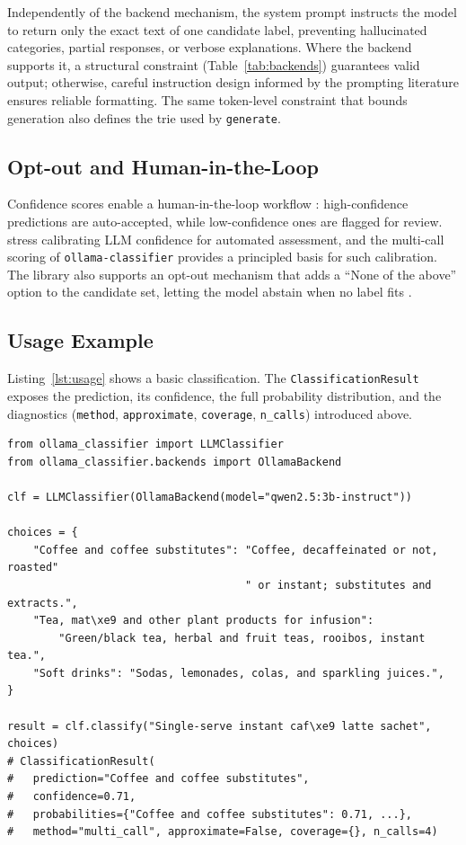 \documentclass[11pt,a4paper]{article}
\begin{document}
Independently of the backend mechanism, the system prompt instructs the model
to return only the exact text of one candidate label, preventing
hallucinated categories, partial responses, or verbose explanations. Where
the backend supports it, a structural constraint (Table~\ref{tab:backends})
guarantees valid output; otherwise, careful instruction design informed by
the prompting literature \citep{liu2023preliminary, mu2024prompt} ensures
reliable formatting. The same token-level constraint that bounds generation
also defines the trie used by \texttt{generate}.

\subsection{Opt-out and Human-in-the-Loop}

Confidence scores enable a human-in-the-loop workflow
\citep{schroeder2025just, hakimi2026humans}: high-confidence predictions are
auto-accepted, while low-confidence ones are flagged for review.
\citet{vasquez2026trust} stress calibrating LLM confidence for automated
assessment, and the multi-call scoring of \texttt{ollama-classifier} provides
a principled basis for such calibration. The library also supports an opt-out
mechanism that adds a ``None of the above'' option to the candidate set,
letting the model abstain when no label fits \citep{nunes2025rac}.

\subsection{Usage Example}

Listing~\ref{lst:usage} shows a basic classification. The
\texttt{ClassificationResult} exposes the prediction, its confidence, the full
probability distribution, and the diagnostics (\texttt{method},
\texttt{approximate}, \texttt{coverage}, \texttt{n\_calls}) introduced above.

\noindent\begin{minipage}{\linewidth}
\begin{lstlisting}[caption={Zero-shot classification with
  \texttt{ollama-classifier} (v0.6.0 API).}, label={lst:usage}]
from ollama_classifier import LLMClassifier
from ollama_classifier.backends import OllamaBackend

clf = LLMClassifier(OllamaBackend(model="qwen2.5:3b-instruct"))

choices = {
    "Coffee and coffee substitutes": "Coffee, decaffeinated or not, roasted"
                                     " or instant; substitutes and extracts.",
    "Tea, mat\xe9 and other plant products for infusion":
        "Green/black tea, herbal and fruit teas, rooibos, instant tea.",
    "Soft drinks": "Sodas, lemonades, colas, and sparkling juices.",
}

result = clf.classify("Single-serve instant caf\xe9 latte sachet", choices)
# ClassificationResult(
#   prediction="Coffee and coffee substitutes",
#   confidence=0.71,
#   probabilities={"Coffee and coffee substitutes": 0.71, ...},
#   method="multi_call", approximate=False, coverage={}, n_calls=4)
\end{lstlisting}
\end{minipage}
\end{document}
